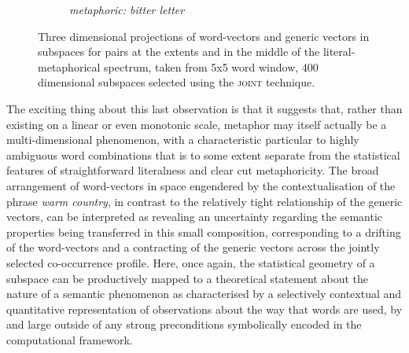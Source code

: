 \begin{figure}
\begin{subfigure}{0.3\textwidth}
\caption*{\footnotesize \emph{metaphoric: bitter letter}}
\end{subfigure}
\caption[Metaphors In Space]{Three dimensional projections of word-vectors and generic vectors in subspaces for pairs at the extents and in the middle of the literal-metaphorical spectrum, taken from 5x5 word window, 400 dimensional subspaces selected using the \textsc{joint} technique.}
\label{fig:metaspaces}
\end{figure}

The exciting thing about this last observation is that it suggests that, rather than existing on a linear or even monotonic scale, metaphor may itself actually be a multi-dimensional phenomenon, with a characteristic particular to highly ambiguous word combinations that is to some extent separate from the statistical features of straightforward literalness and clear cut metaphoricity.  The broad arrangement of word-vectors in space engendered by the contextualisation of the phrase \emph{warm country}, in contrast to the relatively tight relationship of the generic vectors, can be interpreted as revealing an uncertainty regarding the semantic properties being transferred in this small composition, corresponding to a drifting of the word-vectors and a contracting of the generic vectors across the jointly selected co-occurrence profile.  Here, once again, the statistical geometry of a subspace can be productively mapped to a theoretical statement about the nature of a semantic phenomenon as characterised by a selectively contextual and quantitative representation of observations about the way that words are used, by and large outside of any strong preconditions symbolically encoded in the computational framework.

